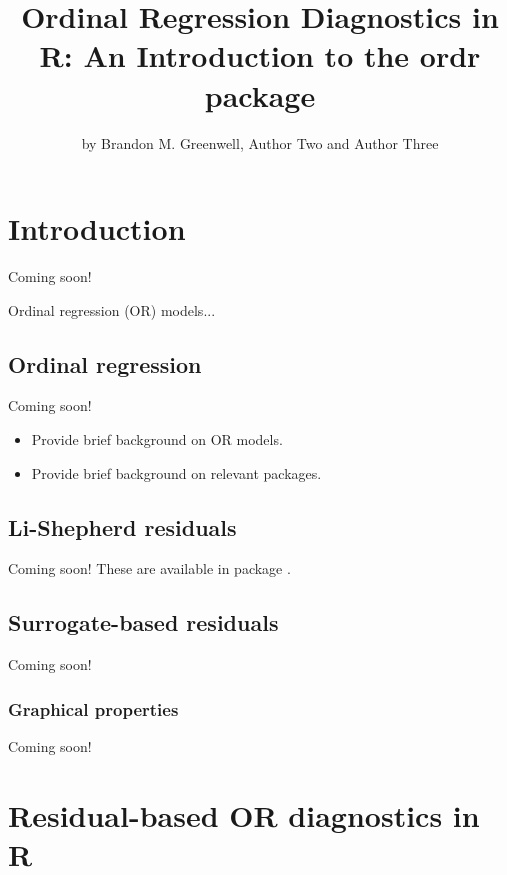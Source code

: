 \title{Ordinal Regression Diagnostics in R: An Introduction to the ordr package}
\author{by Brandon M. Greenwell, Author Two and Author Three}

\maketitle


\section{Introduction}

Coming soon!

Ordinal regression (OR) models...


\subsection{Ordinal regression}

Coming soon!

\begin{itemize}
  \item Provide brief background on OR models.
  \item Provide brief background on relevant packages.
\end{itemize}


\subsection{Li-Shepherd residuals}

Coming soon! These are available in package .


\subsection{Surrogate-based residuals}

Coming soon!


\subsubsection{Graphical properties}

Coming soon!


\section{Residual-based OR diagnostics in R}

